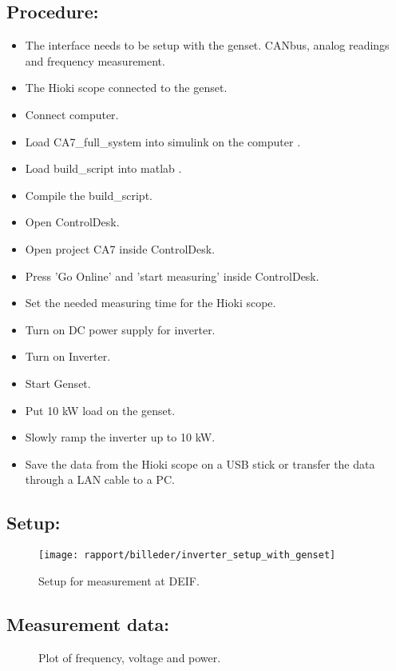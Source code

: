 \subsection*{Procedure:}

\begin{itemize}
	\item The interface needs to be setup with the genset. CANbus, analog readings and frequency measurement.  
	\item The Hioki scope connected to the genset.
	\item Connect computer.
	\item Load CA7\_full\_system into simulink on the computer .
	\item Load build\_script into matlab . 
	\item Compile the build\_script.
	\item Open ControlDesk.
	\item Open project CA7 inside ControlDesk.
	\item Press 'Go Online' and 'start measuring' inside ControlDesk. 
	\item Set the needed measuring time for the Hioki scope.
	\item Turn on DC power supply for inverter.
	\item Turn on Inverter.  
	\item Start Genset.
	\item Put 10 kW load on the genset.
	\item Slowly ramp the inverter up to 10 kW. 
	\item Save the data from the Hioki scope on a USB stick or transfer the data through a LAN cable to a PC.  

\end{itemize}


\subsection*{Setup:}
\begin{figure}[H]
\centering
\texttt{[image: rapport/billeder/inverter\_setup\_with\_genset]}
\caption{Setup for measurement at DEIF.}
\label{fig:inverter_setup_with_genset}
\end{figure} 


\subsection*{Measurement data:}
\begin{figure}[H]
\centering

\caption{Plot of frequency, voltage and power.}
\label{fig:test10powerfreqvolt}
\end{figure}

